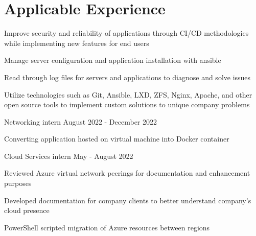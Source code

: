\documentclass[]{deedy-resume-reversed}
\begin{document}
\begin{minipage}[t]{0.58\textwidth}

\section{Applicable Experience}
\vspace{.8}

\vspace{\topsep} %
\begin{tightemize}
\item Improve security and reliability of applications through CI/CD methodologies while implementing new features for end users
\item Manage server configuration and application installation with ansible
\item Read through log files for servers and applications to diagnose and solve issues
\item Utilize technologies such as Git, Ansible, LXD, ZFS, Nginx, Apache, and other open source tools to implement custom solutions to unique company problems
\end{tightemize}
\sectionsep

\begin{tightemize}
\item Networking intern August 2022 - December 2022
\item Converting application hosted on virtual machine into Docker container
\item Cloud Services intern May - August 2022
\item Reviewed Azure virtual network peerings for documentation and enhancement purposes
\item Developed documentation for company clients to better understand company's cloud presence
\item PowerShell scripted migration of Azure resources between regions
\end{tightemize}
\sectionsep


\end{minipage}
\end{document}
